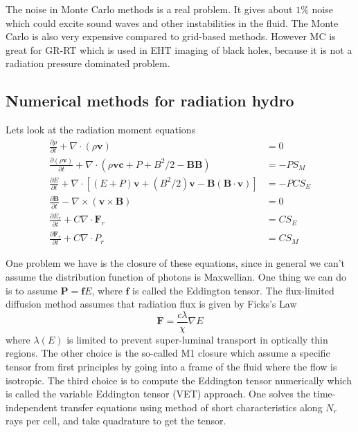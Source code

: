 \documentclass[letterpaper, 11pt]{article}
\numberwithin{equation}{section}
\numberwithin{figure}{section}
\begin{document}
The noise in Monte Carlo methods is a real problem. It gives about $1\%$ noise
which could excite sound waves and other instabilities in the fluid. The Monte
Carlo is also very expensive compared to grid-based methods. However MC is great
for GR-RT which is used in EHT imaging of black holes, because it is not a
radiation pressure dominated problem.

\subsection{Numerical methods for radiation hydro}

Lets look at the radiation moment equations
\begin{align}
  \frac{\partial\rho}{\partial t} + \nabla\cdot(\rho \mathbf{v}) &= 0 \\
  \frac{\partial (\rho \mathbf{v})}{\partial t} + \nabla\cdot(\rho \mathbf{v}\mathbf{c} + P + B^2/2 - \mathbf{B}\mathbf{B}) &= -PS_M \\
  \frac{\partial E}{\partial t} + \nabla\cdot \left[ (E + P)\mathbf{v} + (B^2/2)\mathbf{v} - \mathbf{B}(\mathbf{B}\cdot \mathbf{v}) \right]  &= -PC S_E \\
  \frac{\partial \mathbf{B}}{\partial t} - \nabla\times(\mathbf{v}\times \mathbf{B}) &= 0 \\
  \frac{\partial E_r}{\partial t} + C\nabla\cdot \mathbf{F}_r &= C S_{E} \\
  \frac{\partial \mathbf{F}_r}{\partial t} + C \nabla\cdot P_r &= C S_{M}
\end{align}

One problem we have is the closure of these equations, since in general we can't
assume the distribution function of photons is Maxwellian. One thing we can do
is to assume $\mathbf{P} = \mathbf{f}E$, where $\mathbf{f}$ is called the
Eddington tensor. The flux-limited diffusion method assumes that radiation flux
is given by Ficks's Law
\begin{equation}
  \label{eq:15}
  \mathbf{F} = \frac{c\lambda}{\chi}\nabla E
\end{equation}
where $\lambda(E)$ is limited to prevent super-luminal transport in optically
thin regions. The other choice is the so-called M1 closure which assume a
specific tensor from first principles by going into a frame of the fluid where
the flow is isotropic. The third choice is to compute the Eddington tensor
numerically which is called the variable Eddington tensor (VET) approach. One
solves the time-independent transfer equations using method of short
characteristics along $N_r$ rays per cell, and take quadrature to get the
tensor.
\end{document}
